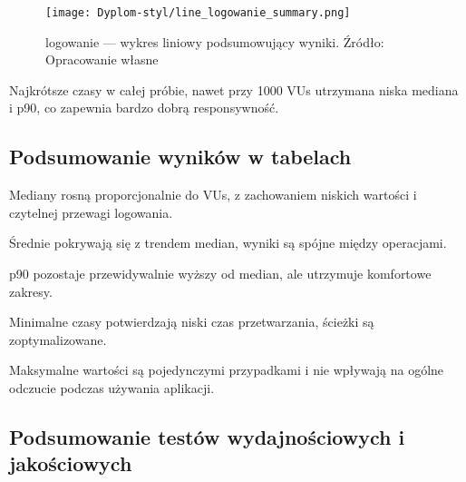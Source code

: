 \begin{figure}[H]\centering
\texttt{[image: Dyplom-styl/line\_logowanie\_summary.png]}
\caption{logowanie — wykres liniowy podsumowujący wyniki. Źródło: Opracowanie własne}\label{fig:line-logowanie-summary}
\end{figure}
Najkrótsze czasy w całej próbie, nawet przy 1000 VUs utrzymana niska mediana i p90, co zapewnia bardzo dobrą responsywność.
\FloatBarrier 

\subsection{Podsumowanie wyników w tabelach}

\begingroup
  \let\oldcaption\caption
  \renewcommand{\caption}[2][]{\oldcaption[#1]{#2. Źródło: opracowanie własne}}
  
\endgroup
Mediany rosną proporcjonalnie do VUs, z zachowaniem niskich wartości i czytelnej przewagi logowania.

\begingroup
  \let\oldcaption\caption
  \renewcommand{\caption}[2][]{\oldcaption[#1]{#2. Źródło: opracowanie własne}}
  
\endgroup
Średnie pokrywają się z trendem median, wyniki są spójne między operacjami.

\begingroup
  \let\oldcaption\caption
  \renewcommand{\caption}[2][]{\oldcaption[#1]{#2. Źródło: opracowanie własne}}
  
\endgroup
p90 pozostaje przewidywalnie wyższy od median, ale utrzymuje komfortowe zakresy.

\begingroup
  \let\oldcaption\caption
  \renewcommand{\caption}[2][]{\oldcaption[#1]{#2. Źródło: opracowanie własne}}
  
\endgroup
Minimalne czasy potwierdzają niski czas przetwarzania, ścieżki są zoptymalizowane.

\begingroup
  \let\oldcaption\caption
  \renewcommand{\caption}[2][]{\oldcaption[#1]{#2. Źródło: opracowanie własne}}
  
\endgroup
Maksymalne wartości są pojedynczymi przypadkami i nie wpływają na ogólne odczucie podczas używania aplikacji.


\FloatBarrier


\subsection{Podsumowanie testów wydajnościowych i jakościowych}

